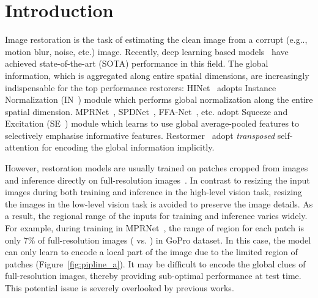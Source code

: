 \documentclass[runningheads]{llncs}
\makeatletter
\DeclareRobustCommand\onedot{\futurelet\@let@token\@onedot}
\def\@onedot{\ifx\@let@token.\else.\null\fi\xspace}
\def\eg{e.g\onedot}
\makeatother
\begin{document}
 \section{Introduction}
Image restoration is the task of estimating the clean image from a corrupt (\eg, motion blur, noise, etc.) image. 
Recently, deep learning based models~\cite{fang2020multi,Zamir2021MPRNet,chen2021hinet} have achieved state-of-the-art (SOTA) performance in this field. 
The global information, which is aggregated along entire spatial dimensions, are increasingly indispensable for the top performance restorers: 
HINet~\cite{chen2021hinet} adopts Instance Normalization (IN~\cite{ulyanov2016instance}) module which performs global normalization along the entire spatial dimension. MPRNet~\cite{Zamir2021MPRNet}, SPDNet~\cite{fang2020multi}, FFA-Net~\cite{qin2020ffa}, etc. adopt Squeeze and Excitation (SE~\cite{hu2018squeeze}) module which learns to use global average-pooled features to selectively emphasise informative features. Restormer~\cite{zamir2021restormer} adopt \textit{transposed} self-attention for encoding the global information implicitly.


However, restoration models are usually trained on patches cropped from images and inference directly on full-resolution images~\cite{Zamir2021MPRNet,zamir2021restormer}. In contrast to resizing the input images during both training and inference in the high-level vision task, resizing the images in the low-level vision task is avoided to preserve the image details. As a result, the regional range of the inputs for training and inference varies widely. For example, during training in MPRNet~\cite{Zamir2021MPRNet}, the range of region for each patch is only 7\% of full-resolution images ( vs. ) in GoPro dataset. 
In this case, the model can only learn to encode a local part of the image due to the limited region of patches (Figure~\ref{fig:pipline_a}).
It may be difficult to encode the global clues of full-resolution images, thereby providing sub-optimal performance at test time. 
This potential issue is severely overlooked by previous works.
\end{document}
